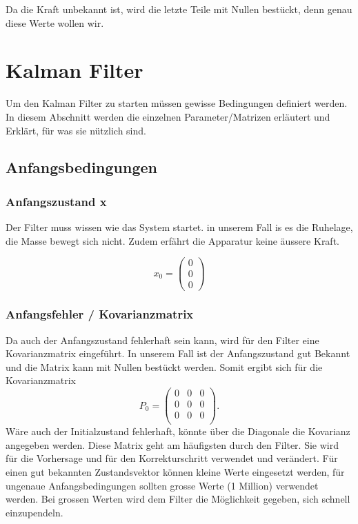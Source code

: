 \documentclass[11pt,a4paper]{article}
\begin{document}
Da die Kraft unbekannt ist, wird die letzte Teile mit Nullen bestückt, denn genau diese Werte wollen wir. 

\section{Kalman Filter}
Um den Kalman Filter zu starten müssen gewisse Bedingungen definiert werden. In diesem Abschnitt werden die einzelnen Parameter/Matrizen erläutert und Erklärt, für was sie nützlich sind. 
\subsection{Anfangsbedingungen}
\subsubsection*{Anfangszustand x}
Der Filter muss wissen wie das System startet. in unserem Fall is es die Ruhelage, die Masse bewegt sich nicht. Zudem erfährt die Apparatur keine äussere Kraft. 

\begin{equation}
{x_0 }= \left( \begin{array}{c} 0\\ 0\\ 0\end{array}\right)
\end{equation} 

\subsubsection*{Anfangsfehler / Kovarianzmatrix}
Da auch der Anfangszustand fehlerhaft sein kann, wird für den Filter eine Kovarianzmatrix eingeführt. In unserem Fall ist der Anfangszustand gut Bekannt und die Matrix kann mit Nullen bestückt werden. Somit ergibt sich für die Kovarianzmatrix
\begin{equation}
{P_0 }=
\left(
\begin{array}{ccc} 	
0 & 0 &0 \\ 
0 &0 & 0 \\ 
0 & 0 &0 \\
\end{array}
\right).
\end{equation}
Wäre auch der Initialzustand fehlerhaft, könnte über die Diagonale die Kovarianz angegeben werden.
Diese Matrix geht am häufigsten durch den Filter. Sie wird für die Vorhersage und für den Korrekturschritt verwendet und verändert. Für einen gut bekannten Zustandsvektor können kleine Werte eingesetzt werden, für ungenaue Anfangsbedingungen sollten grosse Werte (1 Million) verwendet werden. Bei grossen Werten wird dem Filter die Möglichkeit gegeben, sich schnell einzupendeln. 
\end{document}
